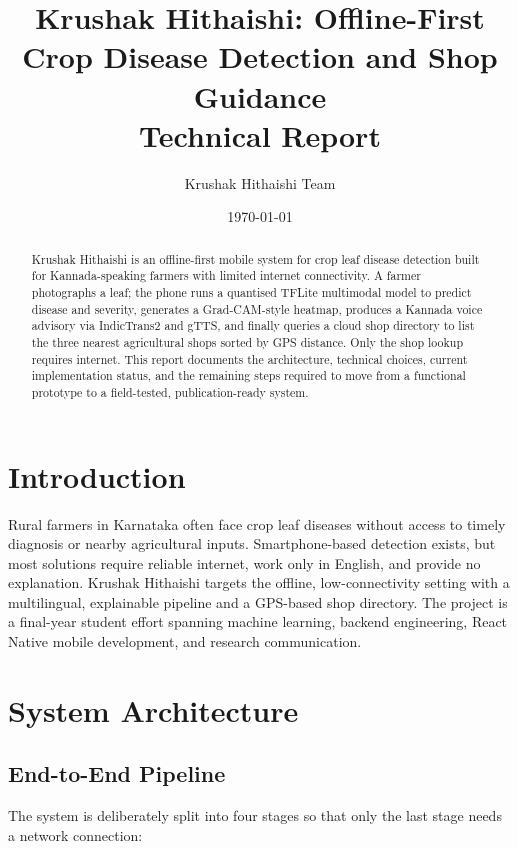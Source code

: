 \documentclass[11pt]{article}
\title{Krushak Hithaishi: Offline-First Crop Disease Detection and Shop Guidance\\
\Large Technical Report}
\author{Krushak Hithaishi Team}
\date{\today}
\begin{document}
\maketitle

\begin{abstract}
Krushak Hithaishi is an offline-first mobile system for crop leaf disease detection built for Kannada-speaking farmers with limited internet connectivity. A farmer photographs a leaf; the phone runs a quantised TFLite multimodal model to predict disease and severity, generates a Grad-CAM-style heatmap, produces a Kannada voice advisory via IndicTrans2 and gTTS, and finally queries a cloud shop directory to list the three nearest agricultural shops sorted by GPS distance. Only the shop lookup requires internet. This report documents the architecture, technical choices, current implementation status, and the remaining steps required to move from a functional prototype to a field-tested, publication-ready system.
\end{abstract}

\section{Introduction}
Rural farmers in Karnataka often face crop leaf diseases without access to timely diagnosis or nearby agricultural inputs. Smartphone-based detection exists, but most solutions require reliable internet, work only in English, and provide no explanation. Krushak Hithaishi targets the offline, low-connectivity setting with a multilingual, explainable pipeline and a GPS-based shop directory. The project is a final-year student effort spanning machine learning, backend engineering, React Native mobile development, and research communication.

\section{System Architecture}

\subsection{End-to-End Pipeline}
The system is deliberately split into four stages so that only the last stage needs a network connection:
\end{document}
